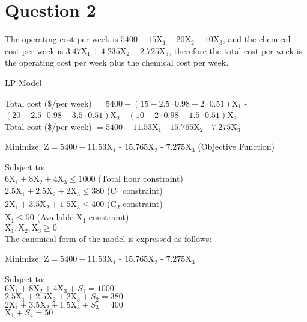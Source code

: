 \section*{Question 2}

The operating cost per week is $5400 - 15$X$_1 - 20$X$_2 - 10$X$_3$, and the chemical cost per week is $3.47$X$_1 + 4.235$X$_2 + 2.725$X$_3$, therefore the total cost per week is the operating cost per week plus the chemical cost per week.

\underline{LP Model}

Total cost (\$/per week) $ = 5400 - (15 - 2.5\cdot0.98 - 2\cdot0.51)$X$_1$ - $(20 - 2.5\cdot0.98 - 3.5\cdot0.51)$X$_2$ - $(10 - 2\cdot0.98 - 1.5\cdot0.51)$X$_3$ \\
Total cost (\$/per week) $ = 5400 - 11.53$X$_1$ - $15.765$X$_2$ - $7.275$X$_3$

Minimize: Z$ = 5400 - 11.53$X$_1$ - $15.765$X$_2$ - $7.275$X$_3$ (Objective Function)

Subject to:\\
$6\text{X}_1 + 8\text{X}_2 + 4\text{X}_3 \leq 1000$ (Total hour constraint) \\
$2.5\text{X}_1 + 2.5\text{X}_2 + 2\text{X}_3 \leq 380$ (C\textsubscript{1} constraint) \\
$2\text{X}_1 + 3.5\text{X}_2 + 1.5\text{X}_3 \leq 400 $ (C\textsubscript{2} constraint) \\
$\text{X}_1 \leq 50$ (Available X\textsubscript{1} constraint) \\
$\text{X}_1, \text{X}_2, \text{X}_3 \geq 0$ \\


The canonical form of the model is expressed as follows:

Minimize: Z$ = 5400 - 11.53$X$_1$ - $15.765$X$_2$ - $7.275$X$_3$

Subject to:\\
$6\text{X}_1 + 8\text{X}_2 + 4\text{X}_3 + S_1 = 1000$ \\
$2.5\text{X}_1 + 2.5\text{X}_2 + 2\text{X}_3 + S_2 = 380$ \\
$2\text{X}_1 + 3.5\text{X}_2 + 1.5\text{X}_3 + S_3 = 400 $ \\
$\text{X}_1 + S_4 = 50$ \\

